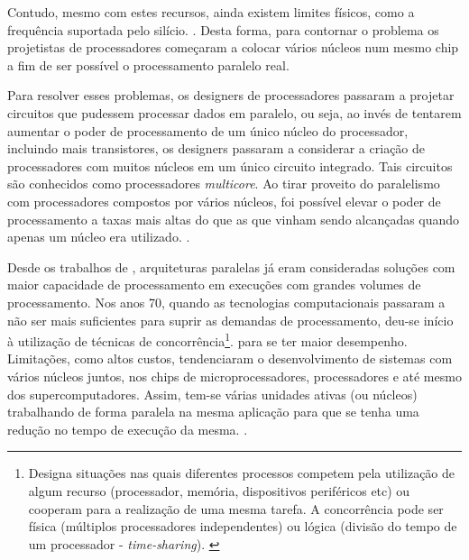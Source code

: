 Contudo, mesmo com estes recursos, ainda existem limites físicos, como a frequência suportada pelo silício. \cite{stallings:2002:arquitetura}. Desta forma, para contornar o problema os projetistas de processadores começaram a colocar vários núcleos num mesmo chip a fim de ser possível o processamento paralelo real.

\begin{citacao}
	Para resolver esses problemas, os designers de processadores passaram a projetar circuitos que pudessem processar dados em paralelo, ou seja, ao invés de tentarem aumentar o poder de processamento de um único núcleo do processador, incluindo mais transistores, os designers passaram a considerar a criação de processadores com muitos núcleos em um único circuito integrado. Tais circuitos são conhecidos como processadores \textit{multicore}. Ao tirar proveito do paralelismo com processadores compostos por vários núcleos, foi possível elevar o poder de processamento a taxas mais altas do que as que vinham sendo alcançadas quando apenas um núcleo era utilizado. \cite{lima:2016:implantacao}.
\end{citacao}

Desde os trabalhos de \citet{vonnewmann:1945:first}, arquiteturas paralelas já eram consideradas soluções com maior capacidade de processamento em execuções com grandes volumes de processamento. Nos anos 70, quando as tecnologias computacionais passaram a não ser mais suficientes para suprir as demandas de processamento, deu-se início à utilização de técnicas de concorrência\footnote{Designa situações nas quais diferentes processos competem pela utilização de algum recurso (processador, memória, dispositivos periféricos etc) ou	cooperam para a realização de uma mesma tarefa. A concorrência pode ser física (múltiplos	processadores independentes) ou lógica (divisão	do tempo de	um	processador	- \textit{time-sharing}). \cite{silberschatz:2008:sistemas}}. para se ter maior desempenho. Limitações, como altos custos, tendenciaram o desenvolvimento de sistemas com vários núcleos juntos, nos chips de microprocessadores, processadores e até mesmo dos supercomputadores. Assim, tem-se várias unidades ativas (ou núcleos) trabalhando de forma paralela na mesma aplicação para que se tenha uma redução no tempo de execução da mesma. \cite{navaux:2011:fund_arquiteturas}.


